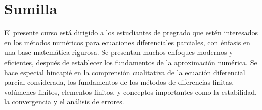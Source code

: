 \section{Sumilla}

El presente curso está dirigido a los estudiantes de pregrado que
estén interesados en los métodos numéricos para ecuaciones
diferenciales parciales, con énfasis en una base matemática rigurosa.
Se presentan muchos enfoques modernos y eficientes, después de
establecer los fundamentos de la aproximación numérica.
Se hace especial hincapié en la comprensión cualitativa de la
ecuación diferencial parcial considerada, los fundamentos de los
métodos de diferencias finitas, volúmenes finitos, elementos
finitos, y conceptos importantes como la estabilidad, la convergencia
y el análisis de errores.


